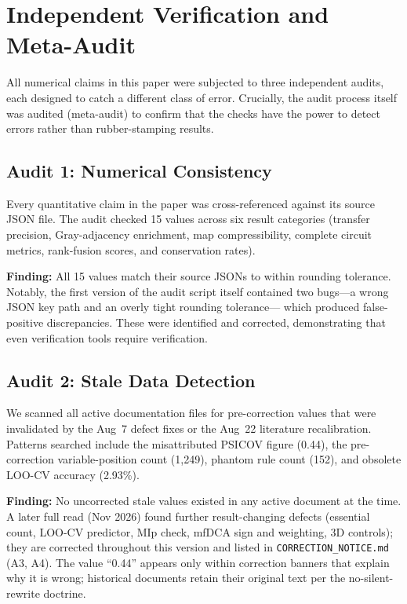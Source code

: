 \section{Independent Verification and Meta-Audit}
\label{sec:independent-audit}

All numerical claims in this paper were subjected to three independent
audits, each designed to catch a different class of error.  Crucially, the
audit process itself was audited (meta-audit) to confirm that the checks have
the power to detect errors rather than rubber-stamping results.

\subsection{Audit 1: Numerical Consistency}
Every quantitative claim in the paper was cross-referenced against its source
JSON file.  The audit checked 15 values across six result categories
(transfer precision, Gray-adjacency enrichment, map compressibility, complete
circuit metrics, rank-fusion scores, and conservation rates).

\textbf{Finding:} All 15 values match their source JSONs to within rounding
tolerance.  Notably, the first version of the audit script itself contained
two bugs---a wrong JSON key path and an overly tight rounding tolerance---%
which produced false-positive discrepancies.  These were identified and
corrected, demonstrating that even verification tools require verification.

\subsection{Audit 2: Stale Data Detection}
We scanned all active documentation files for pre-correction values that were
invalidated by the Aug~7 defect fixes or the Aug~22 literature recalibration.
Patterns searched include the misattributed PSICOV figure (0.44), the
pre-correction variable-position count (1{,}249), phantom rule count (152),
and obsolete LOO-CV accuracy (2.93\%).

\textbf{Finding:} No uncorrected stale values existed in any active
document at the time.  A later full read (Nov 2026) found further result-changing
defects (essential count, LOO-CV predictor, MIp check, mfDCA sign and
weighting, 3D controls); they are corrected throughout this version and listed
in \texttt{CORRECTION\_NOTICE.md} (A3, A4).
The value ``0.44'' appears only within correction banners that explain why it
is wrong; historical documents retain their original text per the no-silent-
rewrite doctrine.

